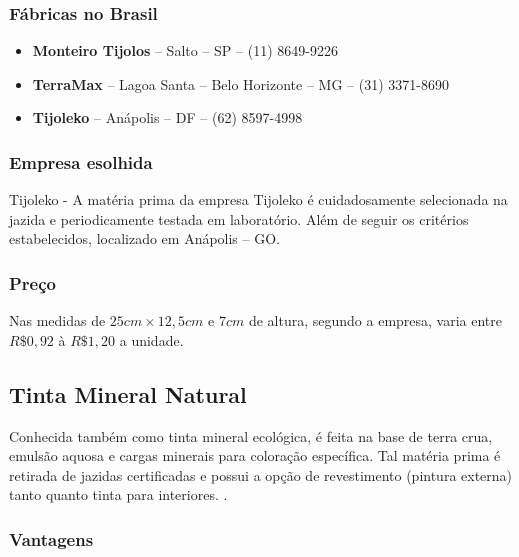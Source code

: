 \subsubsection*{\textbf{Fábricas no Brasil}}

	\begin{itemize}

		\item \textbf{Monteiro Tijolos} – Salto – SP – (11) 8649-9226

		\item \textbf{TerraMax} – Lagoa Santa – Belo Horizonte – MG – (31) 3371-8690

		\item \textbf{Tijoleko} – Anápolis – DF – (62) 8597-4998


	\end{itemize}

\subsubsection*{\textbf{Empresa esolhida}}
	
	Tijoleko - A matéria prima da empresa Tijoleko é cuidadosamente selecionada na jazida e periodicamente testada em laboratório. Além de seguir os critérios estabelecidos, localizado em Anápolis – GO.


\subsubsection*{\textbf{Preço}}

	Nas medidas de $25 cm \times 12,5 cm$ e $7 cm$ de altura, segundo a empresa, varia entre $R\$ 0,92$ à $R\$ 1,20$ a unidade.


\subsection{Tinta Mineral Natural}

	
	Conhecida também como tinta mineral ecológica, é feita na base de terra crua, emulsão aquosa e cargas minerais para coloração específica. Tal matéria prima é retirada de jazidas certificadas e possui a opção de revestimento (pintura externa) tanto quanto tinta para interiores. \cite{EcoCasa}.

\subsubsection*{\textbf{Vantagens}}
	

